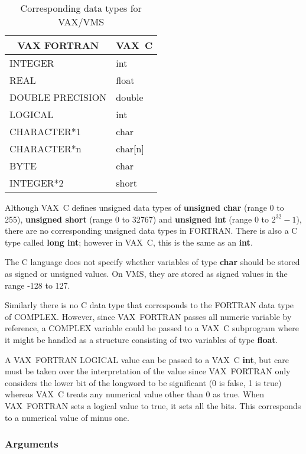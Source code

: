 \begin{table}[htb]
\begin{center}
\begin{tabular}{|l|l|} \hline
\multicolumn{1}{|c|}{VAX FORTRAN} & \multicolumn{1}{c|}{VAX~C} \\ \hline
INTEGER & int \\
REAL & float \\
DOUBLE PRECISION & double \\
LOGICAL & int \\
CHARACTER*1 & char \\
CHARACTER*n & char[n] \\ \hline
BYTE & char \\
INTEGER*2 & short \\ \hline
\end{tabular}
\end{center}
\caption{Corresponding data types for VAX/VMS}
\label{vms:data-types}
\end{table}

Although VAX~C defines unsigned data types of {\bf unsigned char} (range 0 to
255),  {\bf unsigned short} (range 0 to 32767) and {\bf unsigned int} (range 0
to $2^{32}-1$), there are no corresponding unsigned data types in FORTRAN.
There is also a C type called {\bf long int}; however in VAX~C, this is the
same as an {\bf int}.

The C language does not specify whether variables of type {\bf char} should be
stored as signed or unsigned values. On VMS, they are stored as signed
values in the range -128 to 127.

Similarly there is no C data type that corresponds to the FORTRAN data type of
COMPLEX. However, since VAX~FORTRAN passes all numeric variable by reference, a
COMPLEX variable could be passed to a VAX~C subprogram where it might be
handled as a structure consisting of two variables of type {\bf float}.

A VAX~FORTRAN LOGICAL value can be passed to a VAX~C {\bf int}, but care must
be taken over the interpretation of the value since VAX~FORTRAN only considers
the lower bit of the longword to be significant (0 is false, 1 is true) whereas
VAX~C treats any numerical value other than 0 as true. When VAX~FORTRAN sets a
logical value to true, it sets all the bits. This corresponds to a numerical
value of minus one.

\subsubsection{Arguments}
\label{vms:arg}

